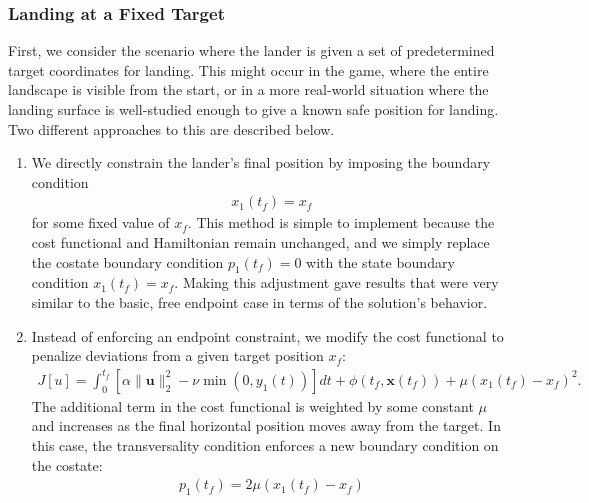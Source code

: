 \documentclass{article}
\begin{document}
\subsubsection{Landing at a Fixed Target}
First, we consider the scenario where the lander is given a set of predetermined target coordinates for landing. This might occur in the game, where the entire landscape is visible from the start, or in a more real-world situation where the landing surface is well-studied enough to give a known safe position for landing. Two different approaches to this are described below.
\begin{enumerate}
    \item We directly constrain the lander’s final position by imposing the boundary condition
    \begin{align*}
        x_1(t_f) = x_f
    \end{align*}
    for some fixed value of $x_f$. This method is simple to implement because the cost functional and Hamiltonian remain unchanged, and we simply replace the costate boundary condition $p_1(t_f)=0$ with the state boundary condition $x_1(t_f) = x_f$. Making this adjustment gave results that were very similar to the basic, free endpoint case in terms of the solution's behavior. 
    \item Instead of enforcing an endpoint constraint, we modify the cost functional to penalize deviations from a given target position $x_f$:
    \begin{align*}
    J[u] = \int_{0}^{t_f} \left[\alpha \|\mathbf{u}\|_2^2 - \nu\min(0, y_1(t))\right] dt + \phi(t_f, \mathbf{x}(t_f)) + \mu (x_1(t_f) - x_f)^2.
    \end{align*}
    The additional term in the cost functional is weighted by some constant $\mu$ and increases as the final horizontal position moves away from the target. In this case, the transversality condition enforces a new boundary condition on the costate:
    \begin{align*}
    p_1(t_f) = 2 \mu (x_1(t_f) - x_f)
    \end{align*}
\end{enumerate}
\end{document}
